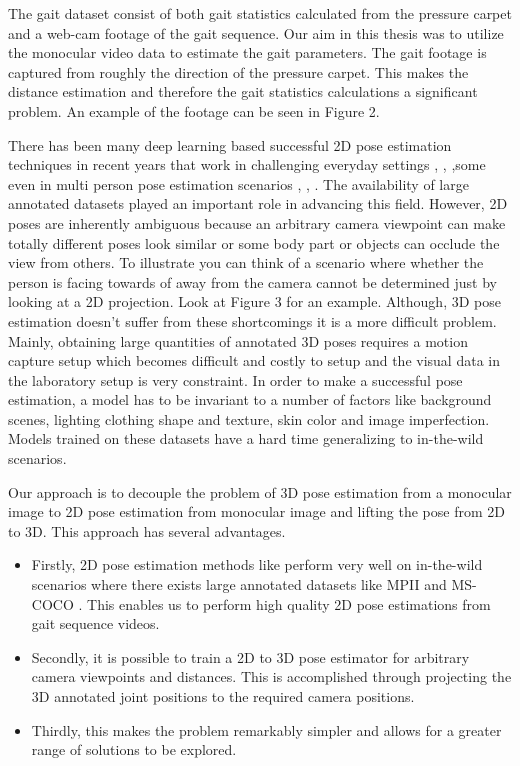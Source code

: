 The gait dataset consist of both gait statistics calculated from the pressure carpet and a web-cam footage of the gait sequence. Our aim in this thesis was to utilize the monocular video data to estimate the gait parameters. The gait footage is captured from roughly the direction of the pressure carpet. This makes the distance estimation and therefore the gait statistics calculations a significant problem. An example of the footage can be seen in Figure 2.

There has been many deep learning based successful 2D pose estimation techniques in recent years that work in challenging everyday settings \parencite{newell2016stacked}, \parencite{chu2017multi}, \parencite{chou2017self} ,some even in multi person pose estimation scenarios \parencite{cao2016realtime}, \parencite{iqbal2017posetrack}, \parencite{insafutdinov2017arttrack}. The availability of large annotated datasets played an important role in advancing this field. However, 2D poses are inherently ambiguous because an arbitrary camera viewpoint can make totally different poses look similar or some body part or objects can occlude the view from others. To illustrate you can think of a scenario where whether the person is facing towards of away from the camera cannot be determined just by looking at a 2D projection. Look at Figure 3 for an example. Although, 3D pose estimation doesn't suffer from these shortcomings it is a more difficult problem. Mainly, obtaining large quantities of annotated 3D poses requires a motion capture setup which becomes difficult and costly to setup and the visual data in the laboratory setup is very constraint. In order to make a successful pose estimation, a model has to be invariant to a number of factors like background scenes, lighting clothing shape and texture, skin color and image imperfection. Models trained on these datasets have a hard time generalizing to in-the-wild scenarios.

Our approach is to decouple the problem of 3D pose estimation from a monocular image to 2D pose estimation from monocular image and lifting the pose from 2D to 3D. This approach has several advantages. 
\begin{itemize}
    \item Firstly, 2D pose estimation methods like \parencite{cao2016realtime} perform very well on in-the-wild scenarios where there exists large annotated datasets like MPII \parencite{andriluka14cvpr} and MS-COCO \parencite{lin2014microsoft}. This enables us to perform high quality 2D pose estimations from gait sequence videos.
    \item Secondly, it is possible to train a 2D to 3D pose estimator for arbitrary camera viewpoints and distances. This is accomplished through projecting the 3D annotated joint positions to the required camera positions.
    \item Thirdly, this makes the problem remarkably simpler and allows for a greater range of solutions to be explored.
\end{itemize}

